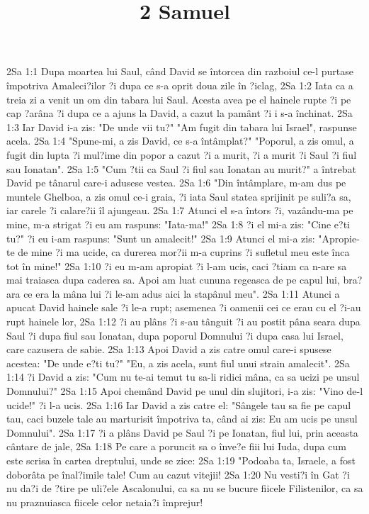 

\title{2 Samuel}

2Sa 1:1  Dupa moartea lui Saul, când David se întorcea din razboiul ce-l purtase împotriva Amaleci?ilor ?i dupa ce s-a oprit doua zile în ?iclag,
2Sa 1:2  Iata ca a treia zi a venit un om din tabara lui Saul. Acesta avea pe el hainele rupte ?i pe cap ?arâna ?i dupa ce a ajuns la David, a cazut la pamânt ?i i s-a închinat.
2Sa 1:3  Iar David i-a zis: "De unde vii tu?" "Am fugit din tabara lui Israel", raspunse acela.
2Sa 1:4  "Spune-mi, a zis David, ce s-a întâmplat?" "Poporul, a zis omul, a fugit din lupta ?i mul?ime din popor a cazut ?i a murit, ?i a murit ?i Saul ?i fiul sau Ionatan".
2Sa 1:5  "Cum ?tii ca Saul ?i fiul sau Ionatan au murit?" a întrebat David pe tânarul care-i adusese vestea.
2Sa 1:6  "Din întâmplare, m-am dus pe muntele Ghelboa, a zis omul ce-i graia, ?i iata Saul statea sprijinit pe suli?a sa, iar carele ?i calare?ii îl ajungeau.
2Sa 1:7  Atunci el s-a întors ?i, vazându-ma pe mine, m-a strigat ?i eu am raspuns: "Iata-ma!"
2Sa 1:8  ?i el mi-a zis: "Cine e?ti tu?" ?i eu i-am raspuns: "Sunt un amalecit!"
2Sa 1:9  Atunci el mi-a zis: "Apropie-te de mine ?i ma ucide, ca durerea mor?ii m-a cuprins ?i sufletul meu este înca tot în mine!"
2Sa 1:10  ?i eu m-am apropiat ?i l-am ucis, caci ?tiam ca n-are sa mai traiasca dupa caderea sa. Apoi am luat cununa regeasca de pe capul lui, bra?ara ce era la mâna lui ?i le-am adus aici la stapânul meu".
2Sa 1:11  Atunci a apucat David hainele sale ?i le-a rupt; asemenea ?i oamenii cei ce erau cu el ?i-au rupt hainele lor,
2Sa 1:12  ?i au plâns ?i s-au tânguit ?i au postit pâna seara dupa Saul ?i dupa fiul sau Ionatan, dupa poporul Domnului ?i dupa casa lui Israel, care cazusera de sabie.
2Sa 1:13  Apoi David a zis catre omul care-i spusese acestea: "De unde e?ti tu?" "Eu, a zis acela, sunt fiul unui strain amalecit".
2Sa 1:14  ?i David a zis: "Cum nu te-ai temut tu sa-li ridici mâna, ca sa ucizi pe unsul Domnului?"
2Sa 1:15  Apoi chemând David pe unul din slujitori, i-a zis: "Vino de-l ucide!" ?i l-a ucis.
2Sa 1:16  Iar David a zis catre el: "Sângele tau sa fie pe capul tau, caci buzele tale au marturisit împotriva ta, când ai zis: Eu am ucis pe unsul Domnului".
2Sa 1:17  ?i a plâns David pe Saul ?i pe Ionatan, fiul lui, prin aceasta cântare de jale,
2Sa 1:18  Pe care a poruncit sa o înve?e fiii lui Iuda, dupa cum este scrisa în cartea dreptului, unde se zice:
2Sa 1:19  "Podoaba ta, Israele, a fost doborâta pe înal?imile tale! Cum au cazut vitejii!
2Sa 1:20  Nu vesti?i în Gat ?i nu da?i de ?tire pe uli?ele Ascalonului, ca sa nu se bucure fiicele Filistenilor, ca sa nu praznuiasca fiicele celor netaia?i împrejur!
